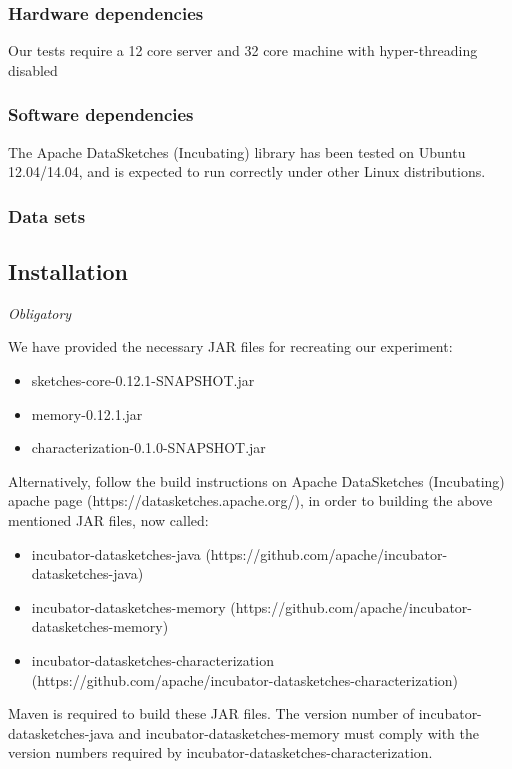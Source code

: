 \documentclass{sigplanconf}
\begin{document}
{\subsubsection{Hardware dependencies}
Our tests require a 12 core server and 32 core machine with hyper-threading disabled

\subsubsection{Software dependencies}
The Apache DataSketches (Incubating) library has been tested on Ubuntu 12.04/14.04,
and is expected to run correctly under other Linux distributions.

\subsubsection{Data sets}

\subsection{Installation}

{\em Obligatory}

We have provided the necessary JAR files for recreating our experiment:
\begin{itemize}
  \item sketches-core-0.12.1-SNAPSHOT.jar
  \item memory-0.12.1.jar
  \item characterization-0.1.0-SNAPSHOT.jar
\end{itemize}

Alternatively, follow the build instructions on Apache DataSketches (Incubating) apache
page (https://datasketches.apache.org/), in order to building the above mentioned
JAR files, now called:
\begin{itemize}
  \item incubator-datasketches-java (https://github.com/apache/incubator-datasketches-java)
  \item incubator-datasketches-memory (https://github.com/apache/incubator-datasketches-memory)
  \item incubator-datasketches-characterization (https://github.com/apache/incubator-datasketches-characterization)
\end{itemize}
\noindent Maven is required to build these JAR files. The version number of incubator-datasketches-java
and incubator-datasketches-memory must comply with the version numbers required by incubator-datasketches-characterization.


}
\end{document}
